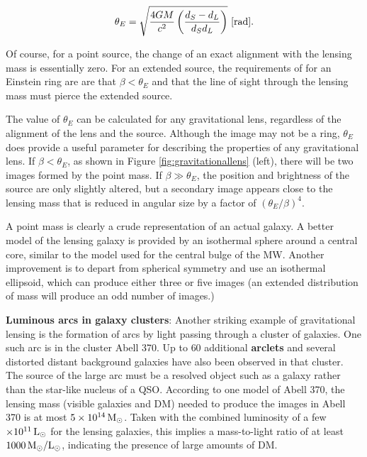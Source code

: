 \documentclass[a4paper,10pt]{article}
\begin{document}
\begin{align*}
    \theta_E = \sqrt{\frac{4GM}{c^2} \left(\frac{d_S-d_L}{d_Sd_L}\right)} ~ [{\rm rad}].
\end{align*}

{\noindent}Of course, for a point source, the change of an exact alignment with the lensing mass is essentially zero. For an extended source, the requirements of for an Einstein ring are are that $\beta<\theta_E$ and that the line of sight through the lensing mass must pierce the extended source. 

{\noindent}The value of $\theta_E$ can be calculated for any gravitational lens, regardless of the alignment of the lens and the source. Although the image may not be a ring, $\theta_E$ does provide a useful parameter for describing the properties of any gravitational lens. If $\beta<\theta_E$, as shown in Figure \ref{fig:gravitationallens} (left), there will be two images formed by the point mass. If $\beta\gg\theta_E$, the position and brightness of the source are only slightly altered, but a secondary image appears close to the lensing mass that is reduced in angular size by a factor of $(\theta_E/\beta)^4$.

{\noindent}A point mass is clearly a crude representation of an actual galaxy. A better model of the lensing galaxy is provided by an isothermal sphere around a central core, similar to the model used for the central bulge of the MW. Another improvement is to depart from spherical symmetry and use an isothermal ellipsoid, which can produce either three or five images (an extended distribution of mass will produce an odd number of images.)

{\noindent}\textbf{Luminous arcs in galaxy clusters}: Another striking example of gravitational lensing is the formation of arcs by light passing through a cluster of galaxies. One such arc is in the cluster Abell 370. Up to $60$ additional \textbf{arclets} and several distorted distant background galaxies have also been observed in that cluster. The source of the large arc must be a resolved object such as a galaxy rather than the star-like nucleus of a QSO. According to one model of Abell 370, the lensing mass (visible galaxies and DM) needed to produce the images in Abell 370 is at most $5\times10^{14}\,{\rm M_\odot}$. Taken with the combined luminosity of a few $\times10^{11}\,{\rm L_\odot}$ for the lensing galaxies, this implies a mass-to-light ratio of at least $1000\,{\rm M_\odot/L_\odot}$, indicating the presence of large amounts of DM.
\end{document}
